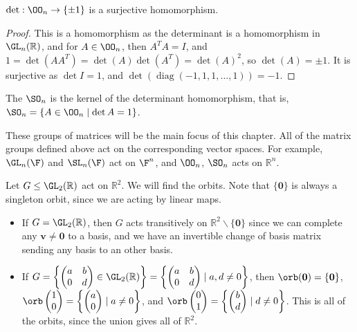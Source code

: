 \documentclass[a4paper]{scrartcl}
\begin{document}
\begin{proposition}
	$\det : \OO_n \rightarrow \{\pm 1\}$ is a surjective homomorphism. 
\end{proposition}
\begin{proof}
	This is a homomorphism as the determinant is a homomorphism in $\GL_n(\mathbb{R})$, and for $A \in \OO_n$, then $A^T A = I$, and $1 = \det(A A^T) = \det(A)\det(A^T) = \det(A)^2$, so $\det(A) = \pm 1$. It is surjective as $\det I = 1$, and $\det(\operatorname{diag}(-1, 1, 1, \dots, 1)) = -1$.
\end{proof}

\begin{definition}
	The  $\SO_n$ is the kernel of the determinant homomorphism, that is, $\SO_n = \{A \in \OO_n \mid \det A = 1 \}$.
\end{definition}

These groups of matrices will be the main focus of this chapter.
All of the matrix groups defined above act on the corresponding vector spaces. For example, $\GL_n(\F)$ and $\SL_n(\F)$ act on $\F^n$, and $\OO_n$, $\SO_n$ acts on $\mathbb{R}^n$.

\begin{example}
	Let $G \leq \GL_2(\mathbb{R})$ act on $\mathbb{R}^2$. We will find the orbits. 
	Note that $\{\mathbf{0}\}$ is always a singleton orbit, since we are acting by linear maps.
	
\begin{itemize}
	\item If $G = \GL_2(\mathbb{R})$, then $G$ acts transitively on $\mathbb{R}^2\backslash \{\mathbf{0}\}$ since we can complete any $\mathbf{v} \neq \mathbf{0}$ to a basis, and we have an invertible change of basis matrix sending any basis to an other basis.
	\item If $G = \left\{\begin{pmatrix}
		a & b \\ 0 & d
	\end{pmatrix} \in \GL_2(\mathbb{R})\right\} =\left\{ \begin{pmatrix}
		a & b \\
		0 & d
	\end{pmatrix} \mid a, d \neq 0 \right\}$, then $\orb(\mathbf{0}) = \{\mathbf{0}\}$, $\orb\begin{pmatrix}
		1 \\ 0
	\end{pmatrix} = \left\{\begin{pmatrix}
		a \\ 0
	\end{pmatrix} \mid a \neq 0 \right\}$, and $\orb\begin{pmatrix}
		0 \\ 1
	\end{pmatrix} =\left \{\begin{pmatrix}
		b\\ d
	\end{pmatrix} \mid d \neq 0 \right\}$. This is all of the orbits, since the union gives all of $\mathbb{R}^2$.
\end{itemize}
\end{example}
\end{document}
